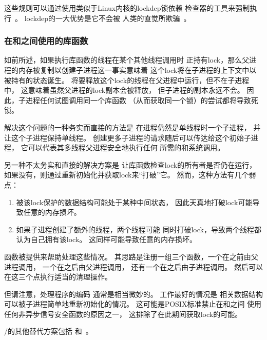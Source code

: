 这些规则可以通过使用类似于Linux内核的lockdep锁依赖
检查器的工具来强制执行~\cite{JonathanCorbet2006lockdep}。
lockdep的一大优势是它不会被
人类的直觉所欺骗~\cite{StevenRostedt2011locdepCryptic}。

\subsubsection{在和之间使用的库函数}
\label{sec:locking:Library Functions Used Between fork() and exec()}

如前所述，如果执行库函数的线程在某个其他线程调用时
正持有lock，那么父进程的内存被复制以创建子进程这一事实意味着
这个lock将在子进程的上下文中以被持有的状态诞生。
将要释放这个lock的线程在父进程中运行，但不在子进程中，
这意味着虽然父进程的lock副本会被释放，
但子进程的副本永远不会。
因此，子进程任何试图调用同一个库函数
（从而获取同一个锁）的尝试都将导致死锁。

解决这个问题的一种务实而直接的方法是
在进程仍然是单线程时一个子进程，
并让这个子进程保持单线程。
创建更多子进程的请求随后可以传达给这个初始子进程，
它可以代表其多线程父进程安全地执行任何
所需的和系统调用。

另一种不太务实和直接的解决方案是
让库函数检查lock的所有者是否仍在运行，
如果没有，则通过重新初始化并获取lock来``打破''它。
然而，这种方法有几个弱点：

\begin{enumerate}
\item	被该lock保护的数据结构可能处于某种中间状态，
	因此天真地打破lock可能导致任意的内存损坏。
\item	如果子进程创建了额外的线程，两个线程可能
	同时打破lock，导致两个线程都认为自己拥有该lock。
	这同样可能导致任意的内存损坏。
\end{enumerate}

函数被提供来帮助处理这些情况。
其思路是注册一组三个函数，一个在之前由父进程调用，
一个在之后由父进程调用，
还有一个在之后由子进程调用。
然后可以在这三个点执行适当的清理操作。

但请注意，处理程序的编码
通常是相当微妙的。
工作最好的情况是
相关数据结构可以被子进程简单地重新初始化的情况。
这可能是POSIX标准禁止在和之间
使用任何非异步信号安全函数的原因之一，
这排除了在此期间获取lock的可能。

/的其他替代方案包括
和~\cite{JoshTriplett2022io_uring_spawn,JakeEdge2022io_uring_spawn}。

